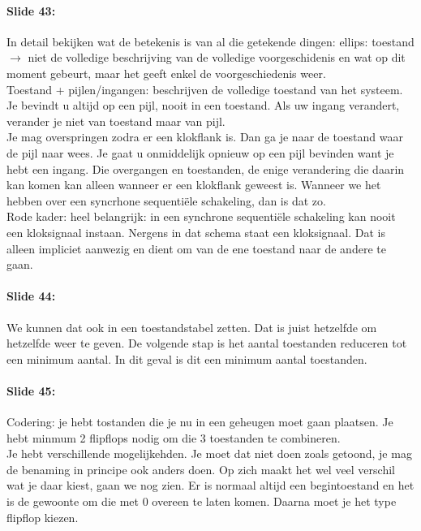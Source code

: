 \documentclass[10pt,a4paper]{book}
\begin{document}
\paragraph{Slide 43:} In detail bekijken wat de betekenis is van al die getekende dingen: ellips: toestand $\rightarrow$ niet de volledige beschrijving van de volledige voorgeschidenis en wat op dit moment gebeurt, maar het geeft enkel de voorgeschiedenis weer.\\
Toestand + pijlen/ingangen: beschrijven de volledige toestand van het systeem. Je bevindt u altijd op een pijl, nooit in een toestand. Als uw ingang verandert, verander je niet van toestand maar van pijl.\\
Je mag overspringen zodra er een klokflank is. Dan ga je naar de toestand waar de pijl naar wees. Je gaat u onmiddelijk opnieuw op een pijl bevinden want je hebt een ingang. Die overgangen en toestanden, de enige verandering die daarin kan komen kan alleen wanneer er een klokflank geweest is. Wanneer we het hebben over een syncrhone sequenti\"ele schakeling, dan is dat zo.\\
Rode kader: heel belangrijk: in een synchrone sequenti\"ele schakeling kan nooit een kloksignaal instaan. Nergens in dat schema staat een kloksignaal. Dat is alleen impliciet aanwezig en dient om van de ene toestand naar de andere te gaan. 

\paragraph{Slide 44:} We kunnen dat ook in een toestandstabel zetten. Dat is juist hetzelfde om hetzelfde weer te geven. De volgende stap is het aantal toestanden reduceren tot een minimum aantal. In dit geval is dit een minimum aantal toestanden.

\paragraph{Slide 45:} Codering: je hebt tostanden die je nu in een geheugen moet gaan plaatsen. Je hebt minmum 2 flipflops nodig om die 3 toestanden te combineren.\\
Je hebt verschillende mogelijkehden. Je moet dat niet doen zoals getoond, je mag de benaming in principe ook anders doen. Op zich maakt het wel veel verschil wat je daar kiest, gaan we nog zien. Er is normaal altijd een begintoestand en het is de gewoonte om die met 0 overeen te laten komen. Daarna moet je het type flipflop kiezen.
\end{document}
